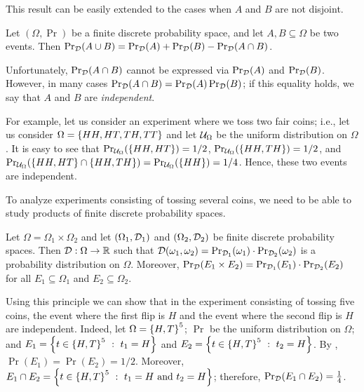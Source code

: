 This result can be easily extended to the cases when $A$ and $B$ are not
disjoint.
\begin{corollary}
\label{corollary:inclusion-exclusion-probability}
  Let $(\Omega, \Pr)$ be a finite discrete probability space, and let $A, B
  \subseteq \Omega$ be two events. Then 
  $\Pr_{\mathcal{D}}(A \cup B) = \Pr_{\mathcal{D}}(A) +
   \Pr_{\mathcal{D}}(B) -
   \Pr_{\mathcal{D}}(A \cap B)$.
\end{corollary}

Unfortunately, $\Pr_{\mathcal{D}}(A \cap B)$ cannot be expressed via
$\Pr_{\mathcal{D}}(A)$ and $\Pr_{\mathcal{D}}(B)$.
However, in many cases $\Pr_{\mathcal{D}}(A \cap B) =
\Pr_{\mathcal{D}}(A) \Pr_{\mathcal{D}}(B)$; if this equality holds,
we say that $A$ and $B$ are \emph{independent}.

For example, let us consider an experiment where we toss two fair coins; i.e.,
let us consider $\Omega = \set{HH, HT, TH, TT}$ and let
$\mathcal{U}_{\Omega}$ be the uniform distribution on $\Omega$. It is easy to
see that $\Pr_{\Uniform{\Omega}}(\set{HH, HT}) = 1 / 2$,
$\Pr_{\Uniform{\Omega}}(\set{HH, TH}) = 1 / 2$, and
$\Pr_{\Uniform{\Omega}}(\set{HH, HT} \cap \set{HH, TH}) =
\Pr_{\Uniform{\Omega}}(\set{HH}) =  1 / 4$. Hence, these two events are
independent.

To analyze experiments consisting of tossing several coins, we need to be able
to study products of finite discrete probability spaces.
\begin{theorem}
\label{theorem:multiplicative-principle-probability}
  Let $\Omega = \Omega_1 \times \Omega_2$ and 
  let $(\Omega_1, \mathcal{D}_1)$ and
  $(\Omega_2, \mathcal{D}_2)$ be finite discrete probability spaces. Then 
  $\mathcal{D} : \Omega \to {\mathbb{R}}$ such that 
  $\mathcal{D}(\omega_1, \omega_2) = 
  \Pr_{\mathcal{D}_1}(\omega_1) \cdot \Pr_{\mathcal{D}_2}(\omega_2)$
  is a probability distribution on $\Omega$.
  Moreover, $\Pr_{\mathcal{D}}(E_1 \times E_2) = 
  \Pr_{\mathcal{D}_1}(E_1) \cdot \Pr_{\mathcal{D}_2}(E_2)$ for all 
  $E_1 \subseteq \Omega_1$ and $E_2 \subseteq \Omega_2$.
\end{theorem}

Using this principle we can show that in the experiment consisting of tossing
five coins, the event where the first flip is $H$ and the event where the second
flip is $H$ are independent. Indeed, let $\Omega = \set{H, T}^5$; 
$\Pr$ be the uniform distribution on $\Omega$; and 
$E_1 = \set[t_1 = H]{t \in \set{H, T}^5}$ and
$E_2 = \set[t_2 = H]{t \in \set{H, T}^5}$. By
,
$\Pr(E_1) = \Pr(E_2) = 1 / 2$. Moreover, 
$E_1 \cap E_2 = \set[t_1 = H \text{ and } t_2 = H]{t \in \set{H, T}^5}$;
therefore, $\Pr_{\mathcal{D}}(E_1 \cap E_2) = \frac{1}{4}$.

